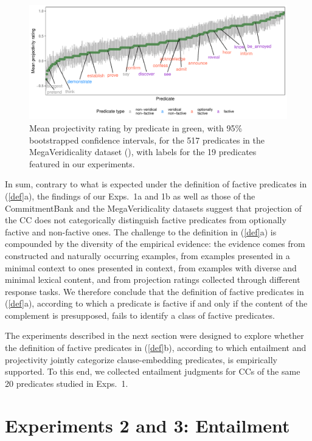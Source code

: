 \documentclass[11pt,fleqn]{article}
\newcommand{\6}{\mbox{$[\hspace*{-.6mm}[$}}
\newcommand{\9}{\mbox{$]\hspace*{-.6mm}]$}}
\begin{document}
\begin{figure}[H]
\centering
\includegraphics[width=.77\paperwidth]{../../MegaVeridicality-analysis/graphs/means-projection-by-predicate}

\caption{Mean projectivity rating by predicate in green, with 95\% bootstrapped confidence intervals, for the 517 predicates in the MegaVeridicality dataset (\citealt{white-rawlins-nels2018,white-etal2018b}), with labels for the 19 predicates featured in our experiments.}
\label{f-white-rawlins-projectivity}
\end{figure}

In sum, contrary to what is expected under the definition of factive predicates in (\ref{def}a), the findings of our Exps.~1a and 1b as well as those of the CommitmentBank and the MegaVeridicality datasets suggest that projection of the CC does not categorically distinguish factive predicates from optionally factive and non-factive ones. The challenge to the definition in (\ref{def}a) is compounded by the diversity of the empirical evidence: the evidence comes from constructed and naturally occurring examples, from examples presented in a minimal context to ones presented in context, from examples with diverse and minimal lexical content, and from projection ratings collected through different response tasks. We therefore conclude that the definition of factive predicates in (\ref{def}a), according to which a predicate is factive if and only if the content of the complement is presupposed, fails to identify a class of factive predicates. 

The experiments described in the next section were designed to explore whether the definition of factive predicates in (\ref{def}b), according to which entailment and projectivity jointly categorize clause-embedding predicates, is empirically supported. To this end, we collected entailment judgments for CCs of the same 20 predicates studied in Exps.~1.

\section{Experiments 2 and 3: Entailment}\label{s3}
\end{document}
